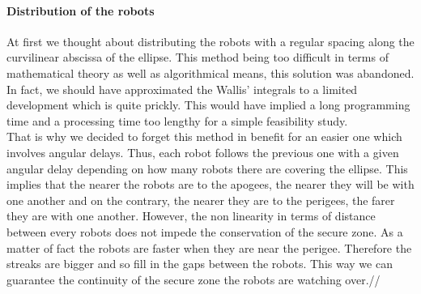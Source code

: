 
\paragraph{Distribution of the robots}

At first we thought about distributing the robots with a regular spacing along the curvilinear abscissa of the ellipse. This method being too difficult in terms of mathematical theory as well as algorithmical means, this solution was abandoned. In fact, we should have approximated the Wallis' integrals to a limited development which is quite prickly. This would have implied a long programming time and a processing time too lengthy for a simple feasibility study.\\

That is why we decided to forget this method in benefit for an easier one which involves angular delays. Thus, each robot follows the previous one with a given angular delay depending on how many robots there are covering the ellipse.
This implies that the nearer the robots are to the apogees, the nearer they will be with one another and on the contrary, the nearer they are to the perigees, the farer they are with one another. However, the non linearity in terms of distance between every robots does not impede the conservation of the secure zone. As a matter of fact the robots are faster when they are near the perigee. Therefore the streaks are bigger and so fill in the gaps between the robots. This way we can guarantee the continuity of the secure zone the robots are watching over.//



